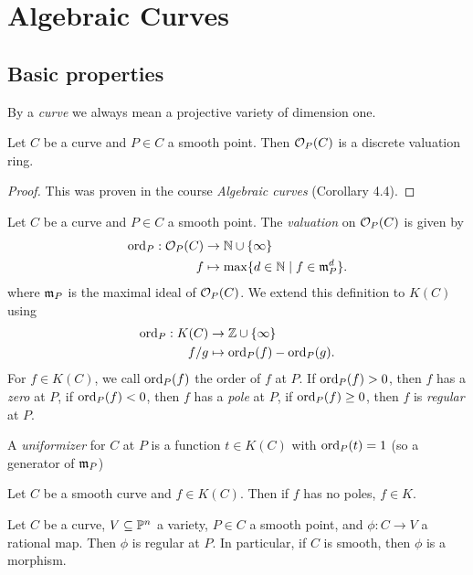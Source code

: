 \section{Algebraic Curves}

\subsection{Basic properties}

By a \emph{curve} we always mean a projective variety of dimension one.

\begin{proposition}
	Let $C$ be a curve and $P \in C$ a smooth point.
	Then $\mathcal{O}_P(C)$ is a discrete valuation ring.
\end{proposition}

\begin{proof}
	This was proven in the course \emph{Algebraic curves}
	(Corollary 4.4).
\end{proof}

\begin{definition}
	Let $C$ be a curve and $P \in C$ a smooth point. The \emph{valuation}
	on $\mathcal{O}_P(C)$ is given by
	\begin{align*}
		\operatorname{ord}_P: \mathcal{O}_P(C) &\to \mathbb{N}\cup\{\infty\}\\
		f &\mapsto \max\{d \in \mathbb{N} \mid f \in \mathfrak{m}_P^d\}.
	\end{align*}
	where $\mathfrak{m}_P$ is the maximal ideal of $\mathcal{O}_P(C)$.
	We extend this definition to $K(C)$ using
	\begin{align*}
		\operatorname{ord}_P: K(C) &\to \mathbb{Z}\cup\{\infty\}\\
		f/g &\mapsto \operatorname{ord}_P(f) - \operatorname{ord}_P(g).
	\end{align*}
	For $f \in K(C)$, we call $\operatorname{ord}_P(f)$ the order of $f$ at $P$.
	If $\operatorname{ord}_P(f) > 0$, then $f$ has a \emph{zero} at $P$,
	if $\operatorname{ord}_P(f) < 0$, then $f$ has a \emph{pole} at $P$,
	if $\operatorname{ord}_P(f) \geq 0$, then $f$ is \emph{regular} at $P$.
	
	A \emph{uniformizer} for $C$ at $P$ is a function $t \in K(C)$ with
	$\operatorname{ord}_P(t) = 1$ (so a generator of $\mathfrak{m}_P$)
\end{definition}

\begin{proposition}
	\label{prop:curves-poles}
	Let $C$ be a smooth curve and $f \in K(C)$. Then if $f$ has no poles,
	$f \in K$.
\end{proposition}

\begin{proposition}
	\label{prop:smooth-morphism}
	Let $C$ be a curve, $V \subseteq \mathbb{P}^n$ a variety,
	$P \in C$ a smooth point, and $\phi: C \to V$ a rational map.
	Then $\phi$ is regular at $P$. In particular, if $C$ is smooth, 
	then $\phi$ is a morphism.
\end{proposition}

